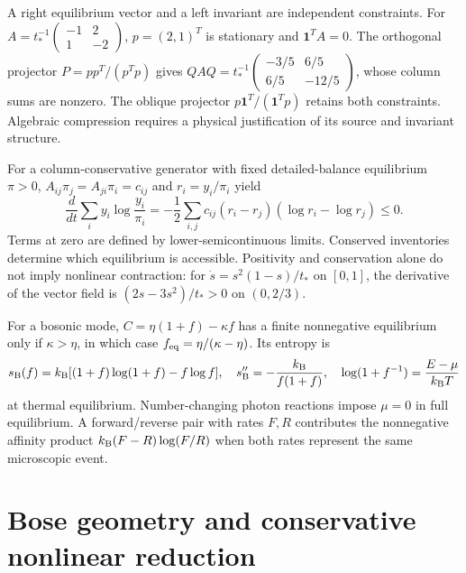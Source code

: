 A right equilibrium vector and a left invariant are independent constraints. For
$A=t_*^{-1}\left(\begin{smallmatrix}-1&2\\1&-2\end{smallmatrix}\right)$,
$p=(2,1)^T$ is stationary and $\boldsymbol1^TA=0$. The orthogonal projector $P=pp^T/(p^Tp)$ gives
$QAQ=t_*^{-1}\left(\begin{smallmatrix}-3/5&6/5\\6/5&-12/5\end{smallmatrix}\right)$, whose column sums are nonzero. The oblique projector $p\boldsymbol1^T/(\boldsymbol1^Tp)$ retains both constraints. Algebraic compression requires a physical justification of its source and invariant structure.

For a column-conservative generator with fixed detailed-balance equilibrium $\pi>0$, $A_{ij}\pi_j=A_{ji}\pi_i=c_{ij}$ and $r_i=y_i/\pi_i$ yield
\begin{equation}
 \frac{d}{dt}\sum_i y_i\log\frac{y_i}{\pi_i}
 =-\frac12\sum_{i,j}c_{ij}(r_i-r_j)(\log r_i-\log r_j)\le0 .
 \label{v:detailed_balance}
\end{equation}
Terms at zero are defined by lower-semicontinuous limits. Conserved inventories determine which equilibrium is accessible. Positivity and conservation alone do not imply nonlinear contraction: for
$\dot s=s^2(1-s)/t_*$ on $[0,1]$, the derivative of the vector field is $(2s-3s^2)/t_*>0$ on $(0,2/3)$.

For a bosonic mode, $C=\eta(1+f)-\kappa f$ has a finite nonnegative equilibrium only if $\kappa>\eta$, in which case $f_{\rm eq}=\eta/(\kappa-\eta)$. Its entropy is
\begin{equation}
 s_{\rm B}(f)=k_{\rm B}[(1+f)\log(1+f)-f\log f],\quad
 s_{\rm B}''=-\frac{k_{\rm B}}{f(1+f)},\quad
 \log(1+f^{-1})=\frac{E-\mu}{k_{\rm B}T}
 \label{v:bose_entropy}
\end{equation}
at thermal equilibrium. Number-changing photon reactions impose $\mu=0$ in full equilibrium. A forward/reverse pair with rates $F,R$ contributes the nonnegative affinity product $k_{\rm B}(F-R)\log(F/R)$ when both rates represent the same microscopic event.

\section{Bose geometry and conservative nonlinear reduction}
\label{v:bose_reduction}

